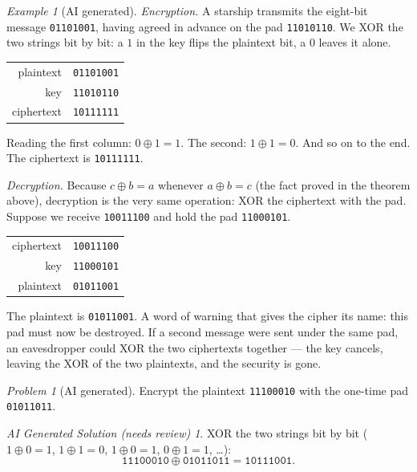 \documentclass{article}
\theoremstyle{plain}
\theoremstyle{definition}
\theoremstyle{remark}
\newtheorem{example}[theorem]{Example}
\newtheorem{problem}[theorem]{Problem}
\newtheorem*{aisolution}{AI Generated Solution (needs review)}
\numberwithin{theorem}{section}
\begin{document}
\begin{example}[AI generated]
\emph{Encryption.}  A starship transmits the eight-bit message \texttt{01101001}, having agreed in advance on the pad \texttt{11010110}.  We XOR the two strings bit by bit:  a $1$ in the key flips the plaintext bit, a $0$ leaves it alone.
\begin{center}
\begin{tabular}{rc}
  plaintext  & \texttt{01101001} \\
  key        & \texttt{11010110} \\
  \hline
  ciphertext & \texttt{10111111} \\
\end{tabular}
\end{center}
Reading the first column:  $0 \oplus 1 = 1$.  The second:  $1 \oplus 1 = 0$.  And so on to the end.  The ciphertext is \texttt{10111111}.

\emph{Decryption.}  Because $c \oplus b = a$ whenever $a \oplus b = c$ (the fact proved in the theorem above), decryption is the very same operation:  XOR the ciphertext with the pad.  Suppose we receive \texttt{10011100} and hold the pad \texttt{11000101}.
\begin{center}
\begin{tabular}{rc}
  ciphertext & \texttt{10011100} \\
  key        & \texttt{11000101} \\
  \hline
  plaintext  & \texttt{01011001} \\
\end{tabular}
\end{center}
The plaintext is \texttt{01011001}.  A word of warning that gives the cipher its name:  this pad must now be destroyed.  If a second message were sent under the same pad, an eavesdropper could XOR the two ciphertexts together --- the key cancels, leaving the XOR of the two plaintexts, and the security is gone.
\end{example}

\begin{problem}[AI generated]
Encrypt the plaintext \texttt{11100010} with the one-time pad \texttt{01011011}.
\end{problem}
\begin{aisolution}
XOR the two strings bit by bit ($1 \oplus 0 = 1$, $1 \oplus 1 = 0$, $1 \oplus 0 = 1$, $0 \oplus 1 = 1$, \ldots):
\[
	\texttt{11100010} \oplus \texttt{01011011} = \texttt{10111001}.
\]
\end{aisolution}
\end{document}
